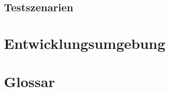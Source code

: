 \documentclass[a4paper]{scrreprt}
\begin{document}
	   
	    
	    \clearpage
	    
	  	\section{Testszenarien}
    
    \chapter{Entwicklungsumgebung}

	\chapter{Glossar}
	
    \glsaddall
    \printglossaries

    \listoffigures
\end{document}
